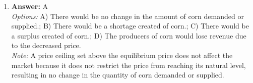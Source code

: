 \documentclass[12pt]{article}
\begin{document}
\begin{enumerate}[label=\arabic*.]
\\ \textit{Note:} In a perfectly competitive market, individual firms are price takers, meaning the market price is established by the overall supply and demand dynamics in the market, rather than by any single firm's decisions.
\item \textbf{Answer:} A
\\ \textit{Options:} A) There would be no change in the amount of corn demanded or supplied.; B) There would be a shortage created of corn.; C) There would be a surplus created of corn.; D) The producers of corn would lose revenue due to the decreased price.
\\ \textit{Note:} A price ceiling set above the equilibrium price does not affect the market because it does not restrict the price from reaching its natural level, resulting in no change in the quantity of corn demanded or supplied.
\end{enumerate}
\end{document}
